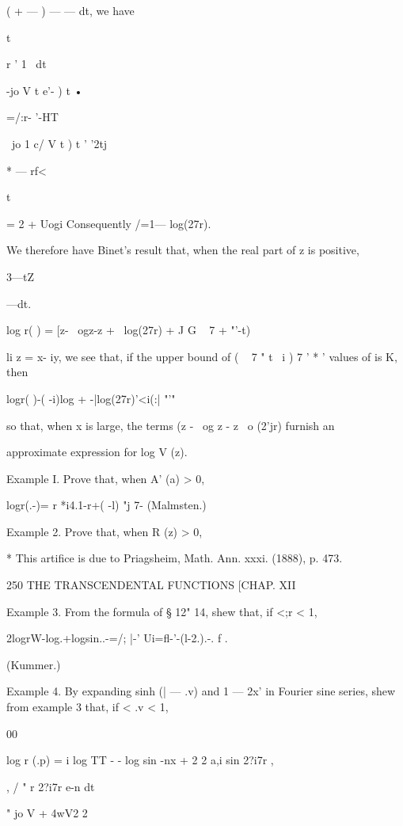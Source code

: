 ( + — ) — — dt, we have



t

r ' 1 \ dt



-jo V t e'- ) t •

=/:r- '-HT

~jo 1 c/ V t ) t ' '2tj



* — rf<

t



= 2 + Uogi Consequently /=1— log(27r).

We therefore have Binet's result that, when the real part of z is
positive,

3—tZ



 —dt.



log r( ) = [z- \ ogz-z + \ log(27r) + J G ~ 7 + "'-t)

li z = x- iy, we see that, if the upper bound of ( ~ 7 " t \ i ) 7 ' *
' values of is K, then

logr( )-( -i)log + -|log(27r)'<i(:| "'"

so that, when x is large, the terms (z - \ og z - z \ o (2'jr) furnish
an

approximate expression for log V (z).

Example I. Prove that, when A' (a) > 0,

logr(.-)= r *i4.1-r+( -l) "j 7- (Malmsten.)

Example 2. Prove that, when R (z) > 0,

* This artifice is due to Priagsheim, Math. Ann. xxxi. (1888), p. 473.



250 THE TRANSCENDENTAL FUNCTIONS [CHAP. XII

Example 3. From the formula of § 12" 14, shew that, if <;r < 1,

2logrW-log.+logsin..-=/; |-' Ui=fl-'-(l-2.).-. f .

(Kummer.)

Example 4. By expanding sinh (| — .v) and 1 — 2x' in Fourier sine
series, shew from example 3 that, if < .v < 1,

00

log r (.p) = i log TT - - log sin -nx + 2 2 a,i sin 2?i7r ,

, / " r 2?i7r e-n dt

" jo V + 4wV2 2%

